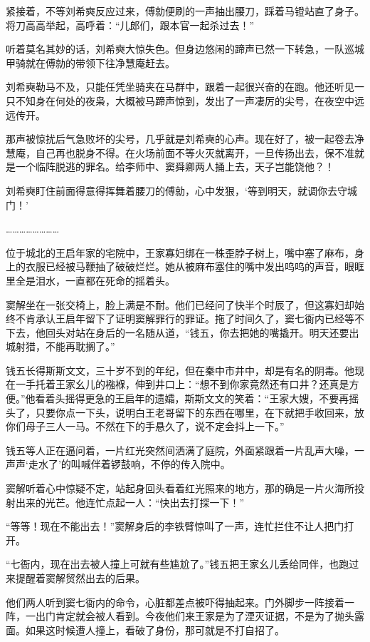 紧接着，不等刘希奭反应过来，傅勍便刷的一声抽出腰刀，踩着马镫站直了身子。将刀高高举起，高呼着：“儿郎们，跟本官一起杀过去！”

听着莫名其妙的话，刘希奭大惊失色。但身边悠闲的蹄声已然一下转急，一队巡城甲骑就在傅勍的带领下往净慧庵赶去。

刘希奭勒马不及，只能任凭坐骑夹在马群中，跟着一起很兴奋的在跑。他还听见一只不知身在何处的夜枭，大概被马蹄声惊到，发出了一声凄厉的尖号，在夜空中远远传开。

那声被惊扰后气急败坏的尖号，几乎就是刘希奭的心声。现在好了，被一起卷去净慧庵，自己再也脱身不得。在火场前面不等火灭就离开，一旦传扬出去，保不准就是一个临阵脱逃的罪名。给李师中、窦舜卿两人捅上去，天子岂能饶他？！

刘希奭盯住前面得意得挥舞着腰刀的傅勍，心中发狠，‘等到明天，就调你去守城门！’

……………………

位于城北的王启年家的宅院中，王家寡妇绑在一株歪脖子树上，嘴中塞了麻布，身上的衣服已经被马鞭抽了破破烂烂。她从被麻布塞住的嘴中发出呜呜的声音，眼眶里全是泪水，一直都在死命的摇着头。

窦解坐在一张交椅上，脸上满是不耐。他们已经问了快半个时辰了，但这寡妇却始终不肯承认王启年留下了证明窦解罪行的罪证。拖了时间久了，窦七衙内已经等不下去，他回头对站在身后的一名随从道，“钱五，你去把她的嘴撬开。明天还要出城射猎，不能再耽搁了。”

钱五长得斯斯文文，三十岁不到的年纪，但在秦中市井中，却是有名的阴毒。他现在一手托着王家幺儿的襁褓，伸到井口上：“想不到你家竟然还有口井？还真是方便。”他看着头摇得更急的王启年的遗孀，斯斯文文的笑着：“王家大嫂，不要再摇头了，只要你点一下头，说明白王老哥留下的东西在哪里，在下就把手收回来，放你们母子三人一马。不然在下的手悬久了，说不定会抖上一下。”

钱五等人正在逼问着，一片红光突然间洒满了庭院，外面紧跟着一片乱声大噪，一声声‘走水了’的叫喊伴着锣鼓响，不停的传入院中。

窦解听着心中惊疑不定，站起身回头看着红光照来的地方，那的确是一片火海所投射出来的光芒。他连忙点起一人：“快出去打探一下！”

“等等！现在不能出去！”窦解身后的李铁臂惊叫了一声，连忙拦住不让人把门打开。

“七衙内，现在出去被人撞上可就有些尴尬了。”钱五把王家幺儿丢给同伴，也跑过来提醒着窦解贸然出去的后果。

他们两人听到窦七衙内的命令，心脏都差点被吓得抽起来。门外脚步一阵接着一阵，一出门肯定就会被人看到。今夜他们来王家是为了湮灭证据，不是为了抛头露面。如果这时候遭人撞上，看破了身份，那可就是不打自招了。

